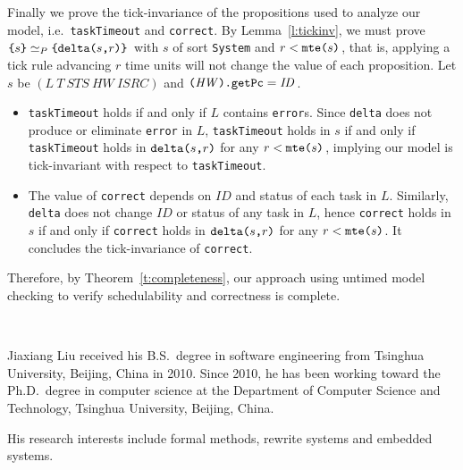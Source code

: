 \documentclass[journal]{IEEEtranTIE}
\begin{document}
\begin{IEEEproof}
Finally we prove the tick-invariance of the propositions used to
analyze our model, i.e.\ \verb|taskTimeout| and \verb|correct|. By
Lemma~\ref{l:tickinv}, we must prove
$\verb|{|s\verb|}|\simeq_P\verb|{|\deltaS{s}{r}\verb|}|$ with $s$ of
sort \verb|System| and $r<\texttt{mte(}s\texttt{)}$, that is, applying a tick rule
advancing $r$ time units will not change the value of each
proposition. Let $s$ be $(L~T~\mathit{STS}~\mathit{HW}~\mathit{ISRC})$
and $\verb|(|\mathit{HW}\verb|).getPc|=\mathit{ID}$.
\begin{itemize}
\item \verb|taskTimeout| holds if and only if $L$ contains
  \verb|error|s. Since \verb|delta| does not produce or eliminate
  \verb|error| in $L$, \verb|taskTimeout| holds in $s$ if and only if
  \verb|taskTimeout| holds in $\texttt{delta(}s\texttt{,}r\texttt{)}$ for any $r<\texttt{mte(}s\texttt{)}$,
  implying our model is tick-invariant with respect to
  \verb|taskTimeout|.
\item The value of \verb|correct| depends on $\mathit{ID}$ and
  status of each task in $L$. Similarly, \verb|delta| does not change
  $\mathit{ID}$ or status of any task in $L$, hence \verb|correct|
  holds in $s$ if and only if \verb|correct| holds in $\texttt{delta(}s\texttt{,}r\texttt{)}$
  for any $r<\texttt{mte(}s\texttt{)}$. It concludes the tick-invariance of
  \verb|correct|.
\end{itemize}

Therefore, by Theorem~\ref{t:completeness}, our approach using untimed
model checking to verify schedulability and correctness is complete.
\end{IEEEproof}




\



\begin{IEEEbiography}%
{Jiaxiang Liu} received his B.S.\ degree in software engineering from
Tsinghua University, Beijing, China in 2010. Since 2010, he has been
working toward the Ph.D.\ degree in computer science at the Department
of Computer Science and Technology, Tsinghua University, Beijing,
China.

His research interests include formal methods, rewrite systems and
embedded systems.
\end{IEEEbiography}
\end{document}
